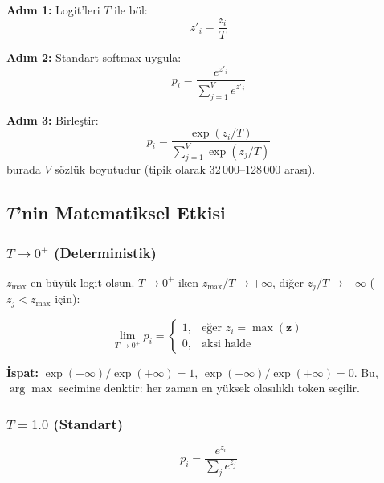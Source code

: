 \begin{formulbox}
\textbf{Ad{\i}m 1:} Logit'leri $T$ ile b\"{o}l:
\begin{equation}
z'_i = \frac{z_i}{T}
\label{eq:temp-scale}
\end{equation}

\textbf{Ad{\i}m 2:} Standart softmax uygula:
\begin{equation}
p_i = \frac{e^{z'_i}}{\sum_{j=1}^{V} e^{z'_j}}
\end{equation}

\textbf{Ad{\i}m 3:} Birle\c{s}tir:
\begin{equation}
\boxed{p_i = \frac{\exp(z_i / T)}{\sum_{j=1}^{V} \exp(z_j / T)}}
\label{eq:softmax-temperature}
\end{equation}
burada $V$ s\"{o}zl\"{u}k boyutudur (tipik olarak 32\,000--128\,000 aras{\i}).
\end{formulbox}


\subsection{$T$'nin Matematiksel Etkisi}
\label{sec:temperature-effect}

\subsubsection{$T \to 0^+$ (Deterministik)}

$z_{\max}$ en b\"{u}y\"{u}k logit olsun. $T \to 0^+$ iken $z_{\max}/T \to +\infty$, di\u{g}er $z_j/T \to -\infty$ ($z_j < z_{\max}$ i\c{c}in):

\begin{equation}
\lim_{T \to 0^+} p_i =
\begin{cases}
1, & \text{e\u{g}er } z_i = \max(\mathbf{z}) \\
0, & \text{aksi halde}
\end{cases}
\label{eq:temp-zero}
\end{equation}

\textbf{\.{I}spat:} $\exp(+\infty)/\exp(+\infty) = 1$, $\exp(-\infty)/\exp(+\infty) = 0$. Bu, $\arg\max$ secimine denktir: her zaman en y\"{u}ksek olas{\i}l{\i}kl{\i} token se\c{c}ilir.

\subsubsection{$T = 1.0$ (Standart)}

\begin{equation}
p_i = \frac{e^{z_i}}{\sum_{j} e^{z_j}}
\end{equation}

